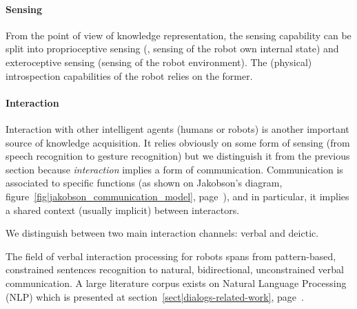 \paragraph{Sensing}

From the point of view of knowledge representation, the sensing capability can
be split into proprioceptive sensing (\ie, sensing of the robot own internal
state) and exteroceptive sensing (sensing of the robot environment). The
(physical) introspection capabilities of the robot relies on the former.


\paragraph{Interaction}

Interaction with other intelligent agents (humans or robots) is another
important source of knowledge acquisition. It relies obviously on some form of
sensing (from speech recognition to gesture recognition) but we distinguish it
from the previous section because \emph{interaction} implies a form of
communication. Communication is associated to specific functions
(as shown on Jakobson's diagram, figure~\ref{fig|jakobson_communication_model},
page~\pageref{fig|jakobson_communication_model}), and in particular, it implies
a shared context (usually implicit) between interactors.

We distinguish between two main interaction channels: verbal and deictic.

\begin{scriptsize}
\begin{center}
\end{center}
\end{scriptsize}

\label{sect|nlp}

The field of verbal interaction processing for robots spans from pattern-based,
constrained sentences recognition to natural, bidirectional, unconstrained
verbal communication. A large literature corpus exists on Natural Language
Processing (NLP) which is presented at section~\ref{sect|dialogs-related-work},
page~\pageref{sect|dialogs-related-work}.

